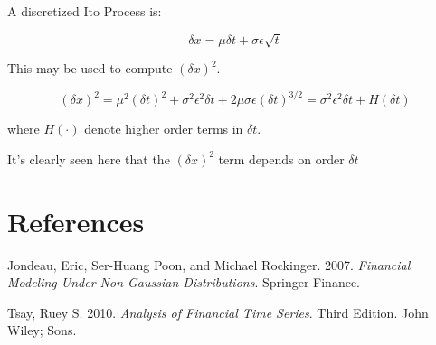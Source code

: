 \documentclass[11pt,]{article}
\begin{document}
A discretized Ito Process is:

\[\delta x = \mu \delta t+\sigma\epsilon \sqrt{t}\]

This may be used to compute \((\delta x)^2\).

\[(\delta x)^2 = \mu^2(\delta t)^2 + \sigma^2 \epsilon^2\delta t+
2\mu\sigma\epsilon(\delta t)^{3/2}=\sigma^2\epsilon^2\delta t+H(\delta t)\]

where \(H(\cdot)\) denote higher order terms in \(\delta t\).

It's clearly seen here that the \((\delta x)^2\) term depends on order
\(\delta t\)

\section*{References}\label{references}

\hypertarget{refs}{}
\hypertarget{ref-Jondeau_Poon_Rockinger:2007}{}
Jondeau, Eric, Ser-Huang Poon, and Michael Rockinger. 2007.
\emph{Financial Modeling Under Non-Gaussian Distributions}. Springer
Finance.

\hypertarget{ref-Tsay:2010}{}
Tsay, Ruey S. 2010. \emph{Analysis of Financial Time Series}. Third
Edition. John Wiley; Sons.
\end{document}
